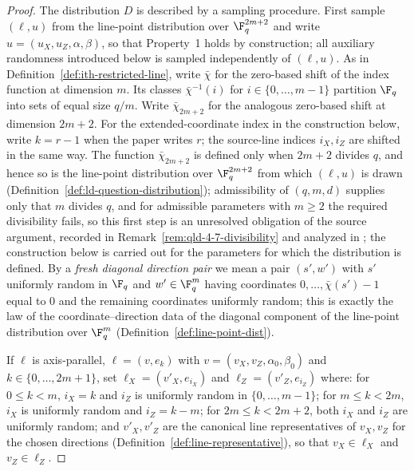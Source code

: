 \begin{proof}
	The distribution $D$ is described by a sampling procedure. First sample
	$(\ell, u)$ from the line-point distribution over $\F_q^{2m+2}$ and write
	$u = (u_X, u_Z, \alpha, \beta)$, so that Property~1 holds by
	construction; all auxiliary randomness introduced below is sampled
	independently of $(\ell, u)$. As in
	Definition~\ref{def:ith-restricted-line}, write $\bar\chi$ for the
	zero-based shift of the index function at dimension $m$. Its classes
	$\bar\chi^{-1}(i)$ for $i \in \{0, \dots, m-1\}$ partition $\F_q$
	into sets of equal size $q/m$. Write $\bar\chi_{2m+2}$ for the analogous
	zero-based shift at dimension $2m+2$. For the extended-coordinate index in
	the construction below, write $k=r-1$ when the paper writes $r$; the
	source-line indices $i_X,i_Z$ are shifted in the same way. The function
	$\bar\chi_{2m+2}$ is defined only when $2m+2$ divides $q$, and hence so is
	the line-point distribution over $\F_q^{2m+2}$ from which $(\ell, u)$ is
	drawn
	(Definition~\ref{def:ld-question-distribution}); admissibility of
	$(q,m,d)$ supplies only that $m$ divides $q$, and for admissible
	parameters with $m \ge 2$ the required divisibility fails, so this
	first step is an unresolved obligation of the source argument, recorded
	in Remark~\ref{rem:qld-4-7-divisibility} and analyzed in
	\cite{gap:qpbt_ld-dimension-divisibility}; the construction below is
	carried out for the parameters for which the distribution is defined.
	By a
	\emph{fresh diagonal direction pair} we mean a pair $(s', w')$ with
	$s'$ uniformly random in $\F_q$ and $w' \in \F_q^m$ having coordinates
	$0, \dots, \bar\chi(s')-1$ equal to $0$ and the remaining coordinates
	uniformly random; this is exactly the law of the coordinate--direction
	data of the diagonal component of the line-point distribution over
	$\F_q^m$ (Definition~\ref{def:line-point-dist}).

	If $\ell$ is axis-parallel, $\ell = (v, e_k)$ with
	$v = (v_X, v_Z, \alpha_0, \beta_0)$ and $k \in \{0, \dots, 2m+1\}$, set
	$\ell_X = (v'_X, e_{i_X})$ and $\ell_Z = (v'_Z, e_{i_Z})$ where: for
	$0 \le k < m$, $i_X = k$ and $i_Z$ is uniformly random in
	$\{0,\dots,m-1\}$; for $m \le k < 2m$, $i_X$ is uniformly random and
	$i_Z = k - m$; for $2m \le k < 2m+2$, both $i_X$ and $i_Z$ are
	uniformly random; and $v'_X, v'_Z$ are the canonical line
	representatives of $v_X, v_Z$ for the chosen directions
	(Definition~\ref{def:line-representative}), so that $v_X \in \ell_X$
	and $v_Z \in \ell_Z$.


\end{proof}
